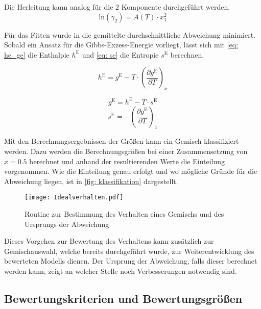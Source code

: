 \documentclass[../thesis.tex]{subfiles}
\begin{document}
Die Herleitung kann analog für die 2 Komponente durchgeführt werden.
\begin{equation}
	\mathrm{ln}(\gamma_2) = A(T) \cdot x_1^2
\end{equation}

Für das Fitten wurde in \cite{jaubert2020benchmark} die gemittelte durchschnittliche Abweichung minimiert. Sobald ein Ansatz für die Gibbs-Exzess-Energie vorliegt, lässt sich mit \autoref{eq: he_ge} die Enthalpie $h^{\mathrm{E}}$ und \autoref{eq: se} die Entropie $s^{\mathrm{E}}$ berechnen.

\begin{equation}
	\label{eq: he_ge}
	h^{\mathrm{E}} = g^{\mathrm{E}} - T \cdot \left( \dfrac{\partial g^{\mathrm{E}}}{\partial T} \right)_x
\end{equation}

\begin{equation}
	\label{eq: se_ansatz}
	g^{\mathrm{E}} = h^{\mathrm{E}} - T \cdot s^{\mathrm{E}}
\end{equation}
\begin{equation}
	\label{eq: se}
	s^{\mathrm{E}} = - \left( \dfrac{\partial g^{\mathrm{E}}}{\partial T} \right)_x
\end{equation}

Mit den Berechnungsergebnissen der Größen kann ein Gemisch klassifiziert werden. Dazu werden die Berechnungsgrößen bei einer Zusammensetzung von $x=\text{0.5}$ berechnet und anhand der resultierenden Werte die Einteilung vorgenommen. Wie die Einteilung genau erfolgt und wo mögliche Gründe für die Abweichung liegen, ist in \autoref{fig: klassifikation} dargestellt.

\begin{figure}[htbp]
	\centering
	\texttt{[image: Idealverhalten.pdf]}
	\caption{Routine zur Bestimmung des Verhalten eines Gemischs und des Ursprungs der Abweichung}
	\label{fig: klassifikation}
\end{figure}

Dieses Vorgehen zur Bewertung des Verhaltens kann zusätzlich zur Gemischauswahl, welche bereits durchgeführt wurde, zur Weiterentwicklung des bewerteten Modells dienen. Der Ursprung der Abweichung, falls dieser berechnet werden kann, zeigt an welcher Stelle noch Verbesserungen notwendig sind.  

\subsection{Bewertungskriterien und Bewertungsgrößen}
\end{document}
